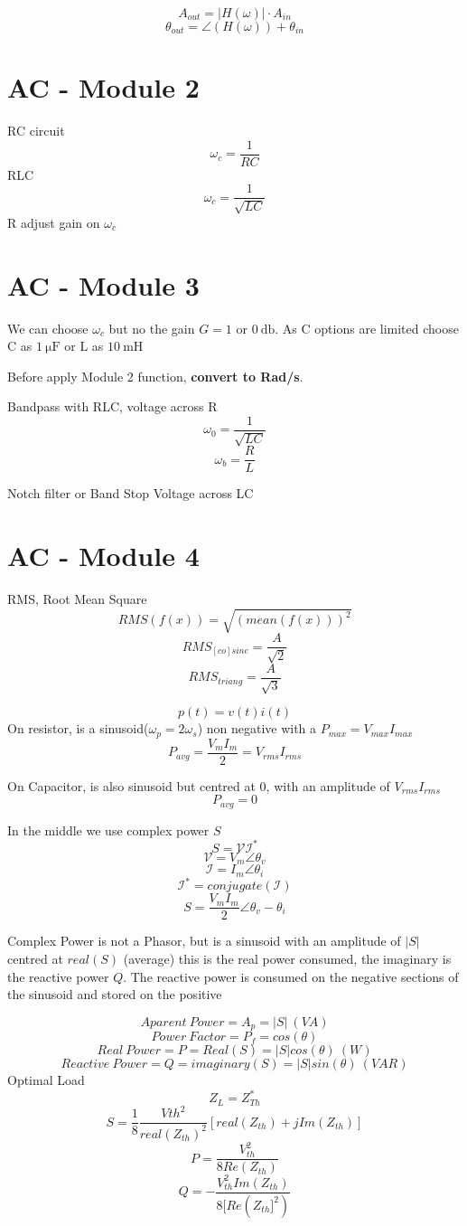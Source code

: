 \documentclass[]{article}
\begin{document}
$$ A_{out} = |H(\omega)|\cdot A_{in} $$
$$ \theta_{out}=\angle(H(\omega)) + \theta_{in}$$

\section{AC - Module 2}
RC circuit
$$\omega _c=\frac{1}{RC}$$ 
RLC
$$\omega _c=\frac{1}{\sqrt{LC}}$$
R adjust gain on $\omega _c$ 
\section{AC - Module 3}
We can choose $\omega _c$ but no the gain $G = 1$ or $\SI{0}{\decibel}$. As C options are limited choose C as $\SI{1}{\micro \farad}$ or L as $\SI{10}{\milli\henry}$

Before apply Module 2 function, \textbf{convert to Rad/s}.

Bandpass with RLC, voltage across R
$$\omega _ 0 = \frac{1}{\sqrt{LC}}$$
$$\omega _b = \frac{R}{L}$$

Notch filter or Band Stop Voltage across LC
\section{AC - Module 4}
RMS, Root Mean  Square
$$RMS (f(x)) =\sqrt{(mean(f(x)))^2} $$
$$RMS_{[co]sine}=\frac{A}{\sqrt{2}}$$
$$RMS_{triang}=\frac{A}{\sqrt{3}}$$


$$p(t)=v(t)i(t)$$
On resistor, is a sinusoid($\omega_p=2\omega_s$) non negative with a $P_{max}=V_{max}I_{max}$
$$P_{avg}=\frac{V_mI_m}{2}=V_{rms}I_{rms}$$

On Capacitor, is also sinusoid but centred at 0, with an amplitude of $V_{rms}I_{rms}$
$$P_{avg}=0$$

In the middle we use complex power $S$
$$S=\mathcal{VI^*}$$
$$\mathcal{V}=V_m\angle{\theta_v}$$
$$\mathcal{I}=I_m\angle{\theta_i}$$
$$\mathcal{I^*}=conjugate(\mathcal{I})$$
$$S=\frac{V_mI_m}{2}\angle{\theta_v-\theta_i}$$

Complex Power is not a Phasor, but is a sinusoid with an amplitude of $|S|$ centred at $real(S)$ (average) this is the real power consumed, the imaginary is the reactive power $Q$. The reactive power is consumed on the negative sections of the sinusoid and stored on the positive

$$Aparent\ Power=A_p=|S|\ (VA)$$
$$Power\ Factor=P_f=cos(\theta)$$
$$Real\ Power=P=Real(S)=|S|cos(\theta)\ (W)$$ 
$$Reactive\ Power=Q=imaginary(S)=|S|sin(\theta)\ (VAR)$$
 Optimal Load
 $$Z_L=Z_{Th}^*$$
 $$ S= \frac{1}{8}\frac{Vth^2}{real(Z_{th})^2}[real(Z_{th})+jIm(Z_{th})]$$
$$P=\frac{V_{th}^2}{8Re(Z_{th})}$$
$$Q=-\frac{V_{th}^2Im(Z_{th})}{8[Re(Z_{th}]^2)}$$
\end{document}
